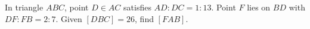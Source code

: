 In triangle $ABC$, point $D\in AC$ satisfies $AD:DC=1:13$. Point $F$ lies on $BD$ with $DF:FB=2:7$. Given $[DBC]=26$, find $[FAB]$.
